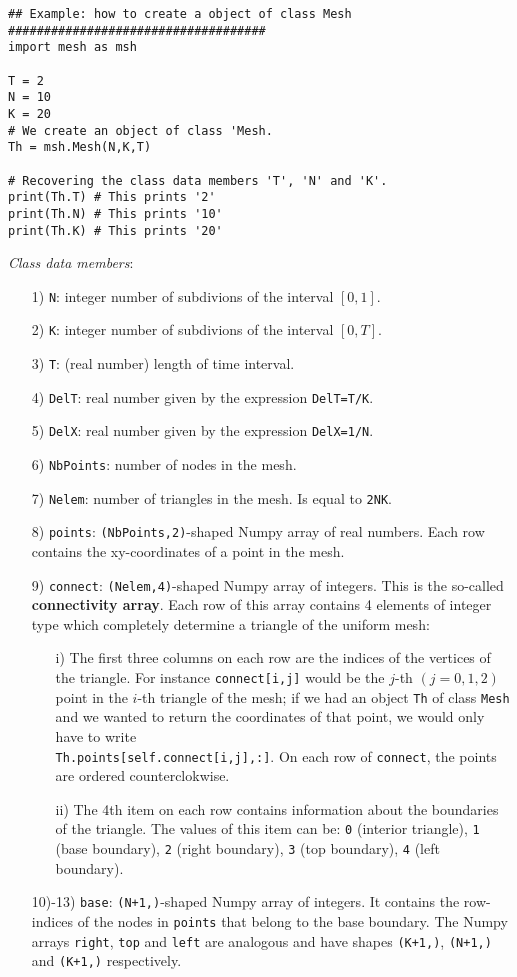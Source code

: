 \documentclass{amsart}
\theoremstyle{plain}
\theoremstyle{definition}
\theoremstyle{remark}
\numberwithin{equation}{section}
\begin{document}
\begin{lstlisting}
## Example: how to create a object of class Mesh
####################################
import mesh as msh

T = 2
N = 10
K = 20
# We create an object of class 'Mesh.
Th = msh.Mesh(N,K,T)

# Recovering the class data members 'T', 'N' and 'K'.
print(Th.T) # This prints '2'
print(Th.N) # This prints '10'
print(Th.K) # This prints '20'
\end{lstlisting}
\textit{Class data members}:
\begin{itemize}
\item[1)] \verb|N|: integer number of subdivions of the interval $[0,1]$.
\item[2)] \verb|K|: integer number of subdivions of the interval $[0,T]$.
\item[3)] \verb|T|: (real number) length of time interval.
\item[4)] \verb|DelT|: real number given by the expression \verb|DelT=T/K|.
\item[5)] \verb|DelX|: real number given by the expression \verb|DelX=1/N|.
\item[6)] \verb|NbPoints|: number of nodes in the mesh.
\item[7)]  \verb|Nelem|: number of triangles in the mesh. Is equal to \verb|2NK|.
\item[8)] \verb|points|: \verb|(NbPoints,2)|-shaped Numpy array of real numbers. Each row contains the
xy-coordinates of a point in the mesh.
\item[9)] \verb|connect|: \verb|(Nelem,4)|-shaped Numpy array of integers. This is the so-called {\bf connectivity array}. Each row of this array contains 4 elements of integer type which completely
determine a triangle of the uniform mesh:
	\begin{itemize}
	\item[i)] The first three columns on each row are the indices of the vertices of the
		triangle. For instance \verb|connect[i,j]| would be the $j$-th $(j=0,1,2)$ point in the
		$i$-th triangle of the mesh; if we had an object \verb|Th| of class \verb|Mesh| and we wanted to 			return the coordinates of that point, we would only have to write \verb|									Th.points[self.connect[i,j],:]|.
		On each row of \verb|connect|, the points are ordered counterclokwise.
	\item[ii)] The 4th item on each row contains information about the boundaries of
		the triangle. The values of this item can be: \verb|0| (interior triangle), \verb|1| (base 					boundary), \verb|2| (right boundary), \verb|3| (top boundary), \verb|4| (left boundary).
	\end{itemize}
\item[10)-13)] \verb|base|: \verb|(N+1,)|-shaped Numpy array of integers. It contains the row-indices of the nodes in \verb|points| that belong to the base boundary. The Numpy arrays \verb|right|, \verb|top| and \verb|left| are analogous and have shapes \verb|(K+1,)|, \verb|(N+1,)| and \verb|(K+1,)| respectively.
\end{itemize}
\end{document}
